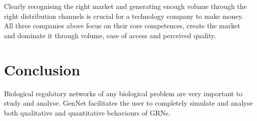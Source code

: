 \documentclass[twocolumn]{bmcart}%
\begin{document}
\par Clearly recognising the right market and generating enough volume through the right distribution channels is crucial for a technology company to make money. All three companies above focus on their core competences, create the market and dominate it through volume, ease of access and perceived quality.
      
\section*{Conclusion}
Biological regulatory networks of any biological problem are very important to study and analyse. GenNet facilitates the user to completely simulate and analyse both qualitative and quantitative behaviours of GRNs.


\begin{backmatter}

\nocite{*}

\end{backmatter}
\end{document}
